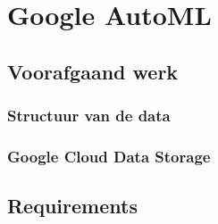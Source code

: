 
\chapter{Google AutoML}
\label{ch:google-automl}

\section{Voorafgaand werk}
\label{sec:google-automl-before}

\subsection{Structuur van de data}
\label{subsec:google-structure}

\subsection{Google Cloud Data Storage}
\label{subsec:google-cloud-data-storage}

\section{Requirements}
\label{sec:google-requirements}